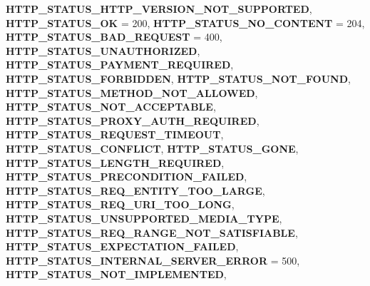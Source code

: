 \begin{DoxyCompactItemize}
{\bfseries H\+T\+T\+P\+\_\+\+S\+T\+A\+T\+U\+S\+\_\+\+H\+T\+T\+P\+\_\+\+V\+E\+R\+S\+I\+O\+N\+\_\+\+N\+O\+T\+\_\+\+S\+U\+P\+P\+O\+R\+T\+ED}, 
\newline
{\bfseries H\+T\+T\+P\+\_\+\+S\+T\+A\+T\+U\+S\+\_\+\+OK} = 200, 
{\bfseries H\+T\+T\+P\+\_\+\+S\+T\+A\+T\+U\+S\+\_\+\+N\+O\+\_\+\+C\+O\+N\+T\+E\+NT} = 204, 
{\bfseries H\+T\+T\+P\+\_\+\+S\+T\+A\+T\+U\+S\+\_\+\+B\+A\+D\+\_\+\+R\+E\+Q\+U\+E\+ST} = 400, 
{\bfseries H\+T\+T\+P\+\_\+\+S\+T\+A\+T\+U\+S\+\_\+\+U\+N\+A\+U\+T\+H\+O\+R\+I\+Z\+ED}, 
\newline
{\bfseries H\+T\+T\+P\+\_\+\+S\+T\+A\+T\+U\+S\+\_\+\+P\+A\+Y\+M\+E\+N\+T\+\_\+\+R\+E\+Q\+U\+I\+R\+ED}, 
{\bfseries H\+T\+T\+P\+\_\+\+S\+T\+A\+T\+U\+S\+\_\+\+F\+O\+R\+B\+I\+D\+D\+EN}, 
{\bfseries H\+T\+T\+P\+\_\+\+S\+T\+A\+T\+U\+S\+\_\+\+N\+O\+T\+\_\+\+F\+O\+U\+ND}, 
{\bfseries H\+T\+T\+P\+\_\+\+S\+T\+A\+T\+U\+S\+\_\+\+M\+E\+T\+H\+O\+D\+\_\+\+N\+O\+T\+\_\+\+A\+L\+L\+O\+W\+ED}, 
\newline
{\bfseries H\+T\+T\+P\+\_\+\+S\+T\+A\+T\+U\+S\+\_\+\+N\+O\+T\+\_\+\+A\+C\+C\+E\+P\+T\+A\+B\+LE}, 
{\bfseries H\+T\+T\+P\+\_\+\+S\+T\+A\+T\+U\+S\+\_\+\+P\+R\+O\+X\+Y\+\_\+\+A\+U\+T\+H\+\_\+\+R\+E\+Q\+U\+I\+R\+ED}, 
{\bfseries H\+T\+T\+P\+\_\+\+S\+T\+A\+T\+U\+S\+\_\+\+R\+E\+Q\+U\+E\+S\+T\+\_\+\+T\+I\+M\+E\+O\+UT}, 
{\bfseries H\+T\+T\+P\+\_\+\+S\+T\+A\+T\+U\+S\+\_\+\+C\+O\+N\+F\+L\+I\+CT}, 
\newline
{\bfseries H\+T\+T\+P\+\_\+\+S\+T\+A\+T\+U\+S\+\_\+\+G\+O\+NE}, 
{\bfseries H\+T\+T\+P\+\_\+\+S\+T\+A\+T\+U\+S\+\_\+\+L\+E\+N\+G\+T\+H\+\_\+\+R\+E\+Q\+U\+I\+R\+ED}, 
{\bfseries H\+T\+T\+P\+\_\+\+S\+T\+A\+T\+U\+S\+\_\+\+P\+R\+E\+C\+O\+N\+D\+I\+T\+I\+O\+N\+\_\+\+F\+A\+I\+L\+ED}, 
{\bfseries H\+T\+T\+P\+\_\+\+S\+T\+A\+T\+U\+S\+\_\+\+R\+E\+Q\+\_\+\+E\+N\+T\+I\+T\+Y\+\_\+\+T\+O\+O\+\_\+\+L\+A\+R\+GE}, 
\newline
{\bfseries H\+T\+T\+P\+\_\+\+S\+T\+A\+T\+U\+S\+\_\+\+R\+E\+Q\+\_\+\+U\+R\+I\+\_\+\+T\+O\+O\+\_\+\+L\+O\+NG}, 
{\bfseries H\+T\+T\+P\+\_\+\+S\+T\+A\+T\+U\+S\+\_\+\+U\+N\+S\+U\+P\+P\+O\+R\+T\+E\+D\+\_\+\+M\+E\+D\+I\+A\+\_\+\+T\+Y\+PE}, 
{\bfseries H\+T\+T\+P\+\_\+\+S\+T\+A\+T\+U\+S\+\_\+\+R\+E\+Q\+\_\+\+R\+A\+N\+G\+E\+\_\+\+N\+O\+T\+\_\+\+S\+A\+T\+I\+S\+F\+I\+A\+B\+LE}, 
{\bfseries H\+T\+T\+P\+\_\+\+S\+T\+A\+T\+U\+S\+\_\+\+E\+X\+P\+E\+C\+T\+A\+T\+I\+O\+N\+\_\+\+F\+A\+I\+L\+ED}, 
\newline
{\bfseries H\+T\+T\+P\+\_\+\+S\+T\+A\+T\+U\+S\+\_\+\+I\+N\+T\+E\+R\+N\+A\+L\+\_\+\+S\+E\+R\+V\+E\+R\+\_\+\+E\+R\+R\+OR} = 500, 
{\bfseries H\+T\+T\+P\+\_\+\+S\+T\+A\+T\+U\+S\+\_\+\+N\+O\+T\+\_\+\+I\+M\+P\+L\+E\+M\+E\+N\+T\+ED}, 

\end{DoxyCompactItemize}
